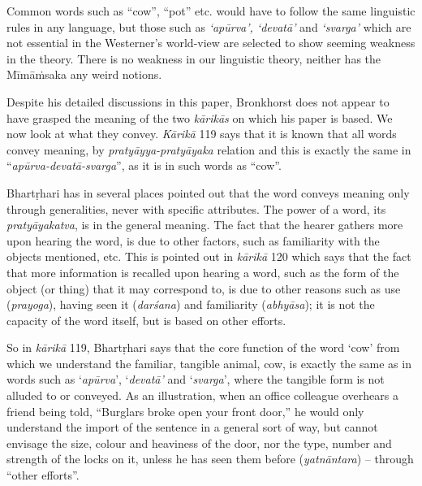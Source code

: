 Common words such as “cow”, “pot” etc. would have to follow the same linguistic rules in any language, but those such as \textit{`apūrva', `devatā'} and \textit{`svarga'} which are not essential in the Westerner’s world-view are selected to show seeming weakness in the theory. There is no weakness in our linguistic theory, neither has the {Mīmāṁsaka} any weird notions.

Despite his detailed discussions in this paper, Bronkhorst does not appear to have grasped the meaning of the two \textit{kārikās} on which his paper is based. We now look at what they convey. \textit{Kārikā} 119 says that it is known that all words convey meaning, by \textit{pratyāyya-pratyāyaka} relation and this is exactly the same in “\textit{apūrva-devatā-svarga}”, as it is in such words as “cow”.

Bhartṛhari has in several places pointed out that the word conveys meaning only through generalities, never with specific attributes. The power of a word, its \textit{pratyāyakatva}, is in the general meaning. The fact that the hearer gathers more upon hearing the word, is due to other factors, such as familiarity with the objects mentioned, etc. This is pointed out in \textit{kārikā} 120 which says that the fact that more information is recalled upon hearing a word, such as the form of the object (or thing) that it may correspond to, is due to other reasons such as use (\textit{prayoga}), having seen it (\textit{darśana}) and familiarity (\textit{abhyāsa}); it is not the capacity of the word itself, but is based on other efforts.

So in \textit{kārikā} 119, Bhartṛhari says that the core function of the word ‘cow’ from which we understand the familiar, tangible animal, cow, is exactly the same as in words such as ‘\textit{apūrva}’, ‘\textit{devatā’} and ‘\textit{svarga}’, where the tangible form is not alluded to or conveyed. As an illustration, when an office colleague overhears a friend being told, “Burglars broke open your front door,” he would only understand the import of the sentence in a general sort of way, but cannot envisage the size, colour and heaviness of the door, nor the type, number and strength of the locks on it, unless he has seen them before (\textit{yatnāntara}) – through “other efforts”.

